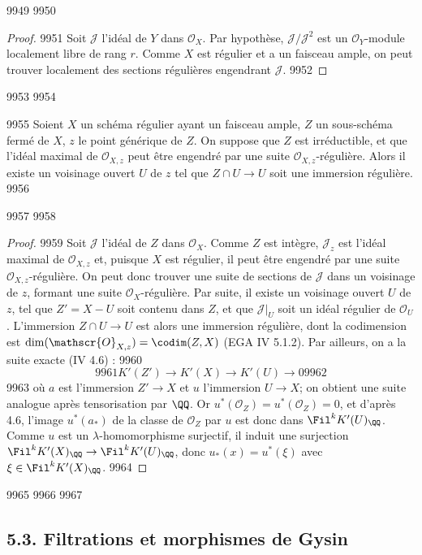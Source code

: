   9949	
  9950	\begin{proof}
  9951	Soit $\mathscr{J}$ l'idéal de $Y$ dans $\mathscr{O}_X$. Par hypothèse, $\mathscr{J}/\mathscr{J}^2$ est un $\mathscr{O}_Y$-module localement libre de rang $r$. Comme $X$ est régulier et a un faisceau ample, on peut trouver localement des sections régulières engendrant $\mathscr{J}$.
  9952	\end{proof}
  9953	
  9954	\begin{theoreme}[5.2]%
  9955	Soient $X$ un schéma régulier ayant un faisceau ample, $Z$ un sous-schéma fermé de $X$, $z$ le point générique de $Z$. On suppose que $Z$ est irréductible, et que l'idéal maximal de $\mathscr{O}_{X,z}$ peut être engendré par une suite $\mathscr{O}_{X,z}$-régulière. Alors il existe un voisinage ouvert $U$ de $z$ tel que $Z \cap U \to U$ soit une immersion régulière.
  9956	\end{theoreme}
  9957	
  9958	\begin{proof}
  9959	Soit $\mathscr{J}$ l'idéal de $Z$ dans $\mathscr{O}_X$. Comme $Z$ est intègre, $\mathscr{J}_z$ est l'idéal maximal de $\mathscr{O}_{X,z}$ et, puisque $X$ est régulier, il peut être engendré par une suite $\mathscr{O}_{X,z}$-régulière. On peut donc trouver une suite de sections de $\mathscr{J}$ dans un voisinage de $z$, formant une suite $\mathscr{O}_X$-régulière. Par suite, il existe un voisinage ouvert $U$ de $z$, tel que $Z' = X - U$ soit contenu dans $Z$, et que $\mathscr{J}|_U$ soit un idéal régulier de $\mathscr{O}_U$. L'immersion $Z \cap U \to U$ est alors une immersion régulière, dont la codimension est $\dim(\mathscr{O}_{X,z}) = \codim(Z,X)$ (EGA IV 5.1.2). Par ailleurs, on a la suite exacte (IV 4.6) :
  9960	\[
  9961	K'(Z') \to K'(X) \to K'(U) \to 0
  9962	\]
  9963	où $a$ est l'immersion $Z' \to X$ et $u$ l'immersion $U \to X$; on obtient une suite analogue après tensorisation par $\QQ$. Or $u^*(\mathscr{O}_Z) = u^*(\mathscr{O}_Z) = 0$, et d'après 4.6, l'image $u^*(a_*)$ de la classe de $\mathscr{O}_Z$ par $u$ est donc dans $\Fil^k K'(U)_{\QQ}$. Comme $u$ est un $\lambda$-homomorphisme surjectif, il induit une surjection $\Fil^k K'(X)_{\QQ} \to \Fil^k K'(U)_{\QQ}$, donc $u_*(x) = u^*(\xi)$ avec $\xi \in \Fil^k K'(X)_{\QQ}$.
  9964	\end{proof}
  9965	
  9966	
  9967	\subsection*{5.3. Filtrations et morphismes de Gysin}
